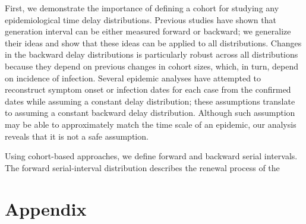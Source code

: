 \documentclass[12pt]{article}
\begin{document}
First, we demonstrate the importance of defining a cohort for studying any epidemiological time delay distributions.
Previous studies have shown that generation interval can be either measured forward or backward;
we generalize their ideas and show that these ideas can be applied to all distributions.
Changes in the backward delay distributions is particularly robust across all distributions because they depend on previous changes in cohort sizes, which, in turn, depend on incidence of infection.
Several epidemic analyses have attempted to reconstruct symptom onset or infection dates for each case from the confirmed dates while assuming a constant delay distribution;
these assumptions translate to assuming a constant backward delay distribution.
Although such assumption may be able to approximately match the time scale of an epidemic, 
our analysis reveals that it is not a safe assumption.

Using cohort-based approaches, we define forward and backward serial intervals.
The forward serial-interval distribution describes the renewal process of the 

\pagebreak

\section*{Appendix}
\end{document}
